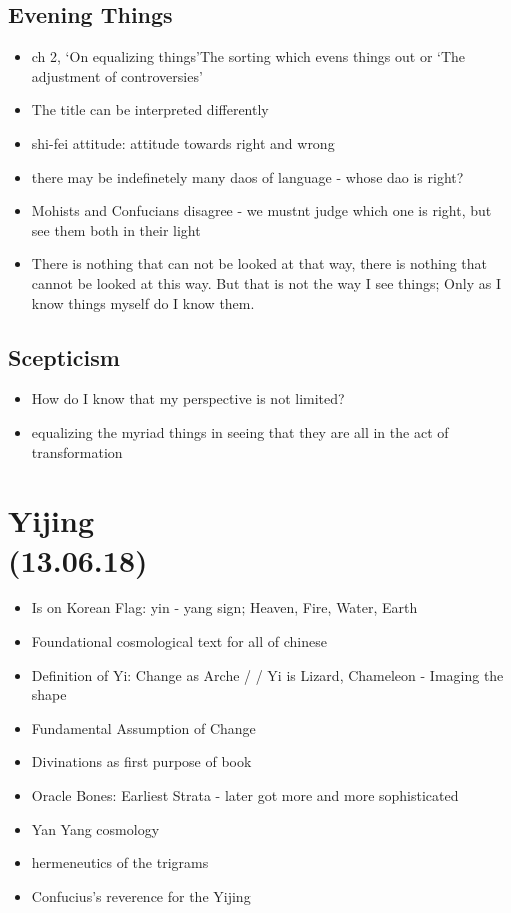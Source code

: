 \documentclass[emulatestandardclasses]{scrartcl}
\begin{document}
\subsection{Evening Things}


\begin{itemize}
  \item ch 2, `On equalizing things'The sorting which evens things out or `The adjustment of controversies'
  \item The title can be interpreted differently
  \item shi-fei attitude: attitude towards right and wrong
  \item there may be indefinetely many daos of language - whose dao is right?
  \item Mohists and Confucians disagree - we mustnt judge which one is right, but see them both in their light
  \item There is nothing that can not be looked at that way, there is nothing that cannot be looked at this way. But that is not the way I see things; Only as I know things myself do I know them.
\end{itemize}

\subsection{Scepticism}


\begin{itemize}
  \item How do I know that my perspective is not limited?
  \item equalizing the myriad things in seeing that they are all in the act of transformation
\end{itemize}



\section{Yijing\\(13.06.18)}

\begin{itemize}
  \item Is on Korean Flag: yin - yang sign; Heaven, Fire, Water, Earth
  \item Foundational cosmological text for all of chinese 
  \item Definition of Yi: Change as Arche / / Yi is Lizard, Chameleon - Imaging the shape
  \item Fundamental Assumption of Change
  \item Divinations as first purpose of book
  \item Oracle Bones: Earliest Strata - later got more and more sophisticated
  \item Yan Yang cosmology
  \item hermeneutics of the trigrams
  \item Confucius's reverence for the Yijing
\end{itemize}
\end{document}
